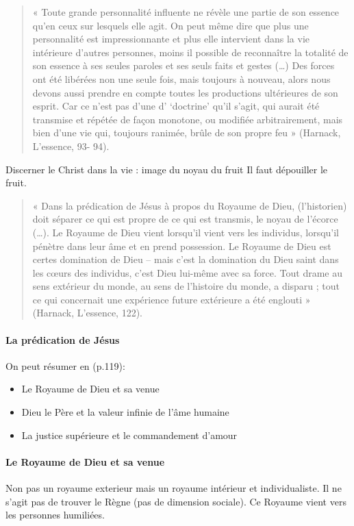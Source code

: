 \begin{quote}
    « Toute grande personnalité influente ne révèle une partie de son essence qu’en ceux sur lesquels elle agit. On peut même dire que plus une personnalité est impressionnante et plus elle intervient dans la vie intérieure d’autres personnes, moins il possible de reconnaître la
totalité de son essence à ses seules paroles et ses seuls faits et gestes (…) Des forces ont été libérées non une seule fois, mais toujours à nouveau, alors nous devons aussi prendre en compte toutes les productions ultérieures de son esprit. Car ce n’est pas d’une d’ ‘doctrine’ qu’il s’agit, qui aurait été transmise et répétée de façon monotone, ou modifiée arbitrairement, mais bien d’une vie qui, toujours ranimée, brûle de son propre feu » (Harnack, L’essence, 93- 94).
\end{quote}


{Discerner le Christ dans la vie : image du noyau du fruit} Il faut dépouiller le fruit. 

\begin{quote}
    « Dans la prédication de Jésus à propos du Royaume de Dieu, (l’historien) doit séparer ce qui est propre de ce qui est transmis, le noyau de l’écorce (…). Le Royaume de Dieu vient lorsqu’il vient vers les individus, lorsqu’il pénètre dans leur âme et en prend possession. Le Royaume de Dieu est certes domination de Dieu – mais c’est la domination du Dieu saint dans les cœurs des individus, c’est Dieu lui-même avec sa force. Tout drame au sens extérieur du monde, au sens de l’histoire du monde, a disparu ; tout ce qui concernait une expérience future extérieure a été englouti » (Harnack, L’essence, 122).
\end{quote}
\paragraph{La prédication de Jésus} On peut résumer en (p.119):
\begin{itemize}
    \item Le Royaume de Dieu et sa venue
    \item Dieu le Père et la valeur infinie de l’âme humaine
    \item La justice supérieure et le commandement d’amour
\end{itemize}


\paragraph{Le Royaume de Dieu et sa venue} Non pas un royaume exterieur mais un royaume intérieur et individualiste. Il ne s'agit pas de trouver le Règne (pas de dimension sociale). Ce Royaume vient vers les personnes humiliées.




